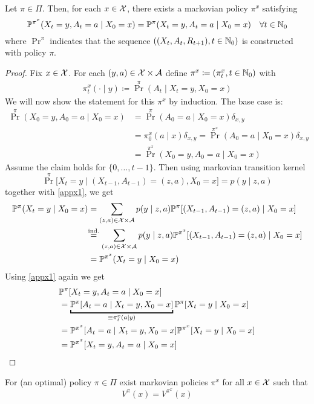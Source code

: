 \begin{prop}
	Let \(\pi\in\Pi\). Then, for each \(x\in\mathcal{X}\), there exists a markovian policy \(\pi^{x}\) satisfying
	\[\mathbb{P}^{\pi^x}(X_t=y,A_t=a\mid X_0=x)=\mathbb{P}^\pi(X_t=y,A_t=a\mid X_0=x)\quad \forall t\in\mathbb{N}_0 \]
	where \(\Pr^\pi\) indicates that the sequence 
	\(((X_t, A_t, R_{t+1}),t\in\mathbb{N}_0 )\) is constructed with policy \(\pi\).
\end{prop}
\begin{proof}
	Fix \(x\in\mathcal{X}\). For each \((y,a)\in\mathcal{X}\times\mathcal{A}\) define \(\pi^x\coloneqq (\pi^x_t,t\in\mathbb{N}_0)\) with
 	\begin{align}
			\pi^x_t(\cdot\mid y)\coloneqq \Pr^\pi (A_t \mid X_t=y,X_0=x)
	\end{align}
	We will now show the statement for this \(\pi^x\) by induction. The base case is:
	\begin{align*}
		\Pr^\pi(X_0=y,A_0=a\mid X_0=x) 
		&= \Pr^\pi(A_0=a\mid X_0=x)\delta_{x,y}\\
		&=\pi^x_0(a\mid x)\delta_{x,y} 
		= \Pr^{\pi^x}(A_0=a\mid X_0=x)\delta_{x,y}\\
		&=\Pr^{\pi^x}(X_0=y, A_0=a\mid X_0=x)
	\end{align*}
	Assume the claim holds for \(\{0,\dots, t-1\}\). Then using markovian transition kernel
	\[\Pr^\pi\big[X_t=y\mid (X_{t-1},A_{t-1})=(z,a), X_0=x\big]=p(y\mid z,a)\]
	together with \ref{appx1}, we get
	\begin{align*}
		\Pr^\pi(X_t=y\mid X_0=x)
		&=\sum_{(z,a)\in\cX\times\cA}p(y\mid z,a)
		\Pr^\pi[(X_{t-1},A_{t-1})=(z,a)\mid X_0=x]\\
		&\lxeq{\text{ind.}} \sum_{(z,a)\in\cX\times\cA}p(y\mid z,a)
		\Pr^{\pi^x}[(X_{t-1},A_{t-1})=(z,a)\mid X_0=x]\\
		&=\Pr^{\pi^x}(X_t=y\mid X_0=x)
	\end{align*}
	Using \ref{appx1} again we get
	\begin{align*}
		&\Pr^{\pi}[X_t=y, A_t=a \mid X_0=x]\\
		&=\underbracket{\Pr^\pi[A_t=a \mid X_t=y, X_0=x]}_{\equiv\pi^x_t(a\mid y)}
		\Pr^\pi[X_t=y\mid X_0=x]\\
		&=\Pr^{\pi^x}[A_t=a \mid X_t=y, X_0=x]\Pr^{\pi^x}[X_t=y\mid X_0=x]\\
		&=\Pr^{\pi^x}[X_t=y, A_t=a \mid X_0=x]\qedhere
	\end{align*}
\end{proof}
\begin{corollary}
	For (an optimal) policy \(\pi\in\Pi\) exist markovian policies \(\pi^x\) for all \(x\in\mathcal{X}\) such that
	\[
		V^\pi(x)=V^{\pi^x}(x)	
	\]
\end{corollary}
